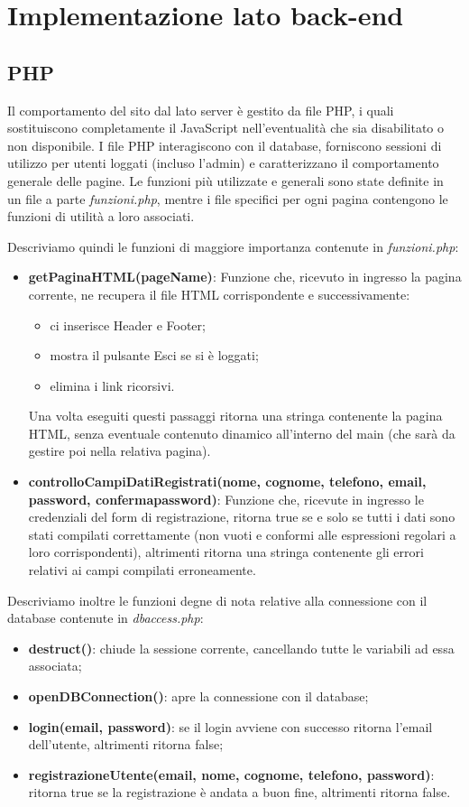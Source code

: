 \section{Implementazione lato back-end}

\subsection{PHP}
Il comportamento del sito dal lato server è gestito da file PHP, i quali sostituiscono completamente il JavaScript nell'eventualità che sia disabilitato o non disponibile. I file PHP interagiscono con il database, forniscono sessioni di utilizzo per utenti loggati (incluso l'admin) e caratterizzano il comportamento generale delle pagine. Le funzioni più utilizzate e generali sono state definite in un file a parte \textit{funzioni.php}, mentre i file specifici per ogni pagina contengono le funzioni di utilità a loro associati. 

Descriviamo quindi le funzioni di maggiore importanza contenute in \textit{funzioni.php}:
\begin{itemize}
\item \textbf{getPaginaHTML(pageName)}: Funzione che, ricevuto in ingresso la pagina corrente, ne recupera il file HTML corrispondente e successivamente:
\begin{itemize}
\item ci inserisce Header e Footer;
\item mostra il pulsante Esci se si è loggati;
\item elimina i link ricorsivi.
\end{itemize}
Una volta eseguiti questi passaggi ritorna una stringa contenente la pagina HTML, senza eventuale contenuto dinamico all'interno del main (che sarà da gestire poi nella relativa pagina).
\item \textbf{controlloCampiDatiRegistrati(nome, cognome, telefono, email, password, confermapassword)}: Funzione che, ricevute in ingresso le credenziali del form di registrazione, ritorna true se e solo se tutti i dati sono stati compilati correttamente (non vuoti e conformi alle espressioni regolari a loro corrispondenti), altrimenti ritorna una stringa contenente gli errori relativi ai campi compilati erroneamente. \\
\end{itemize}


Descriviamo inoltre le funzioni degne di nota relative alla connessione con il database contenute in \textit{dbaccess.php}:
\begin{itemize}
\item \textbf{destruct()}: chiude la sessione corrente, cancellando tutte le variabili ad essa associata;
\item \textbf{openDBConnection()}: apre la connessione con il database;
\item \textbf{login(email, password)}: se il login avviene con successo ritorna l'email dell'utente, altrimenti ritorna false;
\item \textbf{registrazioneUtente(email, nome, cognome, telefono, password)}: ritorna true se la registrazione è andata a buon fine, altrimenti ritorna false.
\end{itemize}


